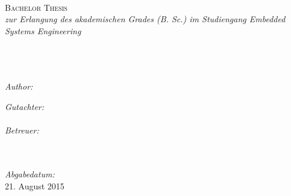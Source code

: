 \documentclass[a4paper, 11pt, oneside]{Thesis} %
\begin{document}
\begin{titlepage}
\begin{center}

\textsc{\LARGE \univname}\\[1.5cm] %
\deptname\\\groupname\\[2cm] %


\textsc{\Large Bachelor Thesis}\\[0.5cm] %

\large \textit{zur Erlangung des akademischen Grades \degreename (B. Sc.) im Studiengang Embedded Systems Engineering} \\[0.3cm] %




\HRule \\[0.4cm] %
{\huge \bfseries \ttitle}\\[0.4cm] %
\HRule \\[1.5cm] %
 
\begin{minipage}{0.4\textwidth}
\begin{flushleft} \large
\emph{Author:}\\
{\authornames} %
\end{flushleft}
\end{minipage}
\begin{minipage}{0.4\textwidth}
\begin{flushright} \large
\emph{Gutachter:} \\
{\examname} \\
\emph{Betreuer:} \\
{\supname} \\
\end{flushright}
\end{minipage}\\[3cm]
 
\emph{Abgabedatum:}\\
{\large 21. August 2015}\\[4cm] %
 
\vfill
\end{center}

\end{titlepage}

\end{document}
